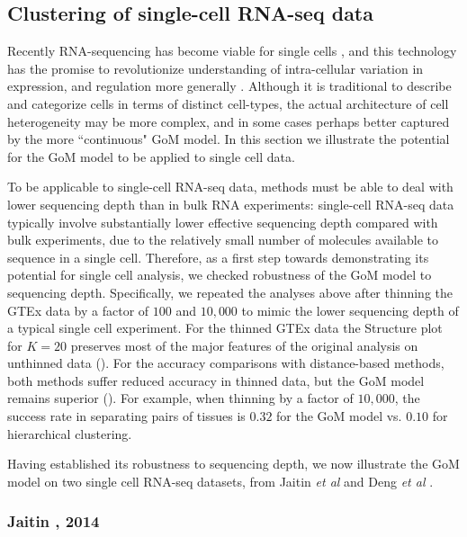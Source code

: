 \documentclass[10pt,letterpaper]{article}
\begin{document}
\subsection*{Clustering of single-cell RNA-seq data}

Recently RNA-sequencing has become viable for single cells \cite{Tang2009}, and this technology has the promise to revolutionize understanding of intra-cellular variation in expression, and regulation more generally \cite{Trapnell2015}. Although it is traditional to describe and categorize cells in terms of distinct cell-types,
the actual architecture of cell heterogeneity may be more complex, and in some cases perhaps better captured by the more ``continuous"  GoM model. In this section we illustrate the potential for the GoM model to be applied to single cell data.

To be applicable to single-cell RNA-seq data, methods must be able to deal with lower sequencing depth than in bulk RNA experiments:
 single-cell RNA-seq data typically involve substantially lower effective sequencing depth compared with bulk experiments, due to the relatively small number of molecules available to sequence in a single cell. Therefore, as a first step towards demonstrating its potential for single cell analysis, we checked robustness of the GoM model to sequencing depth. Specifically,
we repeated the analyses above after thinning the GTEx data by a factor of $100$ and $10,000$ to mimic the lower sequencing depth of a typical single cell experiment. For the thinned GTEx data the Structure plot for $K=20$ preserves most of the major features of the original analysis on unthinned data (). For the accuracy comparisons with distance-based methods, both methods suffer reduced accuracy in thinned data, but the GoM model remains superior (). For example, when thinning by a factor of $10,000$, the success rate in separating pairs of tissues is $0.32$ for the GoM model vs. $0.10$ for hierarchical clustering.

Having established its robustness to sequencing depth, we now illustrate the GoM model on two single cell RNA-seq datasets, from Jaitin \textit{et al} \cite{Jaitin2014} and Deng \textit{et al} \cite{Deng2014}.


\subsubsection*{Jaitin , 2014}
\end{document}
